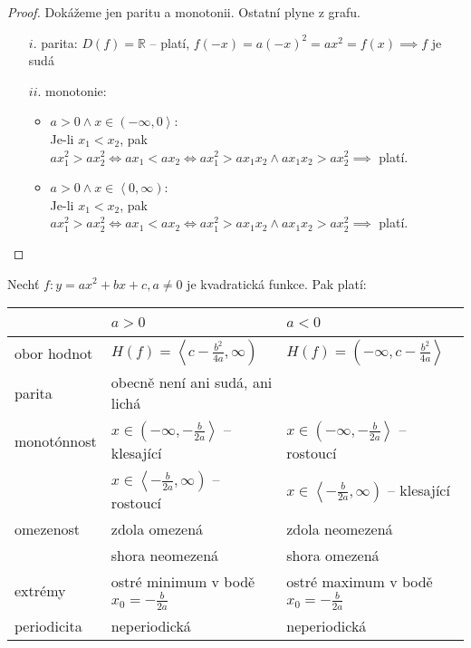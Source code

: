 \begin{proof}
    Dokážeme jen paritu a monotonii. Ostatní plyne z grafu.
    \begin{enumerate}
        \item[$i.$] parita: $D(f) = \mathbb R$ -- platí, $f(-x)=a(-x)^2=ax^2=f(x) \implies f$ je sudá
        \item[$ii.$] monotonie: \begin{itemize}
        \item $a>0 \land x\in \left (-\infty,0\right >$: \\
        Je-li $x_1<x_2$, pak $ax_1^2 > ax_2^2 \iff ax_1 <ax_2 \iff ax_1^2>ax_1x_2 \land ax_1x_2 > ax_2^2 \implies$ platí.
            \item $a>0 \land x\in \left <0,\infty\right )$: \\
            Je-li $x_1<x_2$, pak $ax_1^2 > ax_2^2 \iff ax_1 <ax_2 \iff ax_1^2>ax_1x_2 \land ax_1x_2 > ax_2^2 \implies$ platí.\qedhere
        \end{itemize}
    \end{enumerate}
\end{proof}

\begin{veta}
  Nechť $f:y = ax^2+bx+c, a \neq 0$ je kvadratická funkce. Pak platí:
  \begin{center}
    \begin{tabularx}{\textwidth}{ l | l  l }
        \, & $a>0$ & $a<0$ \\
        \hline
        obor hodnot & $H(f) = \left <c-\frac{b^2}{4a}, \infty \right)$ & $H(f) = \left (-\infty, c-\frac{b^2}{4a}\right >$ \\
        parita & obecně není ani sudá, ani lichá & \, \\
        monotónnost & $x \in \left (-\infty, -\frac{b}{2a} \right >$ -- klesající & $x \in \left (-\infty, -\frac{b}{2a} \right >$ -- rostoucí \\
        \, & $x \in \left < -\frac{b}{2a}, \infty \right )$ -- rostoucí & $x \in \left < -\frac{b}{2a}, \infty \right )$ -- klesající \\
        omezenost & zdola omezená & zdola neomezená \\
        \, & shora neomezená & shora omezená \\
        extrémy &  ostré minimum v bodě $x_0=-\frac{b}{2a}$ & ostré maximum v bodě $x_0=-\frac{b}{2a}$ \\
        periodicita & neperiodická & neperiodická
    \end{tabularx}
  \end{center}
\end{veta}

